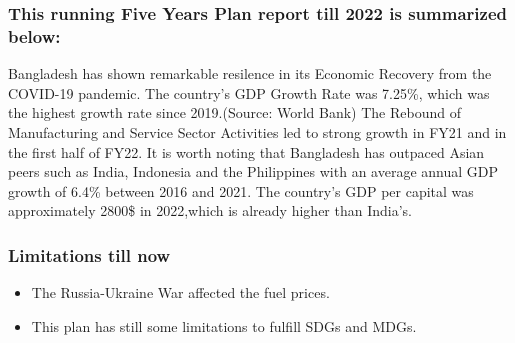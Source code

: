\subsubsection{This running Five Years Plan report till 2022 is summarized below:}
Bangladesh has shown remarkable resilence in its Economic Recovery from the COVID-19
pandemic. The country's GDP Growth Rate was 7.25\%, which was the highest growth rate
since 2019.(Source: World Bank) The Rebound of Manufacturing and Service Sector Activities led to strong growth in FY21
and in the first half of FY22. It is worth noting that Bangladesh has outpaced Asian peers such as India, Indonesia and the
Philippines with an average annual GDP growth of 6.4\% between 2016 and 2021.
The country's GDP per capital was approximately 2800\$ in 2022,which is already higher than India's.

\subsubsection{Limitations till now}
\begin{itemize}
	\item The Russia-Ukraine War affected the fuel prices.
	\item This plan has still some limitations to fulfill SDGs and MDGs.
\end{itemize}








